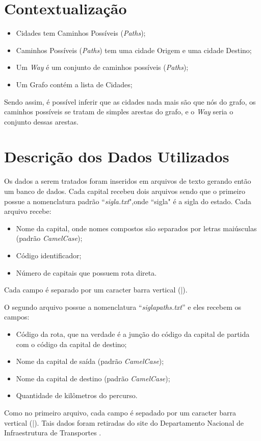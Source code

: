 \section{Contextualização}
\begin{itemize}
  \item Cidades tem Caminhos Possíveis (\textit{Paths});
  \item Caminhos Possíveis (\textit{Paths}) tem uma cidade Origem e uma cidade Destino;
  \item Um \textit{Way} é um conjunto de caminhos possíveis (\textit{Paths});
  \item Um Grafo contém a lista de Cidades;
\end{itemize}

Sendo assim, é possível inferir que as cidades nada mais são que nós do grafo, os caminhos possíveis se tratam de simples arestas do grafo, e o \textit{Way} seria o conjunto dessas arestas.


\section{Descrição dos Dados Utilizados}

Os dados a serem tratados foram inseridos em arquivos de texto gerando então um banco de dados. Cada
capital recebeu dois arquivos sendo que o primeiro possue a nomenclatura padrão ``\textit{sigla.txt}",onde ``sigla" é a sigla do estado. Cada arquivo recebe:

\begin{itemize}
 	\item Nome da capital, onde nomes compostos são separados por letras maiúsculas (padrão \textit{CamelCase});
    \item Código identificador;
	\item Número de capitais que possuem rota direta.
\end{itemize}

Cada campo é separado por um caracter barra vertical (|).

O segundo arquivo possue a nomenclatura ``\textit{sigla\underline{\hspace{.1in}}paths.txt}'' e eles recebem os campos:

\begin{itemize}
	\item Código da rota, que na verdade é a junção do código da capital de partida com o código da capital de destino;
	\item Nome da capital de saída (padrão \textit{CamelCase});
	\item Nome da capital de destino (padrão \textit{CamelCase});
	\item Quantidade de kilômetros do percurso.
\end{itemize}

Como no primeiro arquivo, cada campo é sepadado por um caracter barra vertical (|). Tais dados foram retiradas do site do Departamento Nacional de Infraestrutura de Transportes \cite{DNIT}.
